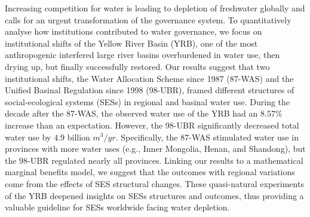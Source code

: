 Increasing competition for water is leading to depletion of freshwater globally and calls for an urgent transformation of the governance system. To quantitatively analyse how institutions contributed to water governance, we focus on institutional shifts of the Yellow River Basin (YRB), one of the most anthropogenic interfered large river basins overburdened in water use, then drying up, but finally successfully restored. Our results suggest that two institutional shifts, the Water Allocation Scheme since 1987 (87-WAS) and the Unified Basinal Regulation since 1998 (98-UBR), framed different structures of social-ecological systems (SESs) in regional and basinal water use. During the decade after the 87-WAS, the observed water use of the YRB had an $8.57\%$ increase than an expectation. However, the 98-UBR significantly decreased total water use by $4.9$ billion $m^3/yr$. Specifically, the 87-WAS stimulated water use in provinces with more water uses (e.g., Inner Mongolia, Henan, and Shandong), but the 98-UBR regulated nearly all provinces. Linking our results to a mathematical marginal benefits model, we suggest that the outcomes with regional variations come from the effects of SES structural changes. These quasi-natural experiments of the YRB deepened insights on SESs structures and outcomes, thus providing a valuable guideline for SESs worldwide facing water depletion.
